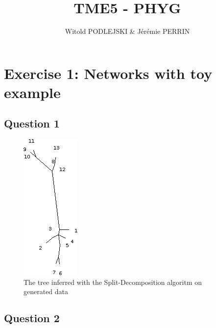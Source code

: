 \documentclass[]{article}
\title{TME5 - PHYG}
\author{Witold PODLEJSKI \& Jérémie PERRIN}
\theoremstyle{definition}
\begin{document}
\maketitle

\section{Exercise 1: Networks with toy example}

\subsection{Question 1}

\begin{figure}[H]
	\centering
	\includegraphics*[scale=0.8]{image/ex1qt1.png}
	\caption{ The tree inferred with the Split-Decomposition algoritm on generated data }
\end{figure}

\subsection{Question 2}
\end{document}
